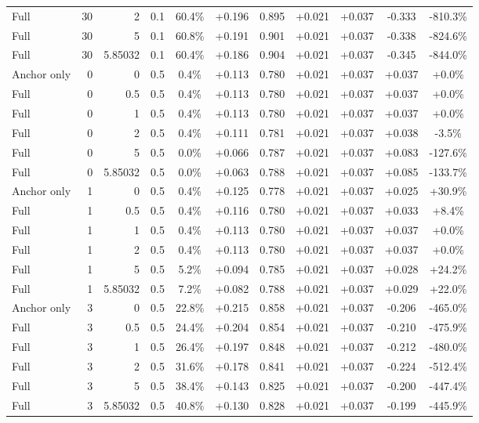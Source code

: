 \begin{table}[htbp]
\begin{tabular}{lrrrccccccc}
Full & 30 & 2 & 0.1 & 60.4\% & +0.196 & 0.895 & +0.021 & +0.037 & -0.333 & -810.3\% \\
Full & 30 & 5 & 0.1 & 60.8\% & +0.191 & 0.901 & +0.021 & +0.037 & -0.338 & -824.6\% \\
Full & 30 & 5.85032 & 0.1 & 60.4\% & +0.186 & 0.904 & +0.021 & +0.037 & -0.345 & -844.0\% \\
Anchor only & 0 & 0 & 0.5 & 0.4\% & +0.113 & 0.780 & +0.021 & +0.037 & +0.037 & +0.0\% \\
Full & 0 & 0.5 & 0.5 & 0.4\% & +0.113 & 0.780 & +0.021 & +0.037 & +0.037 & +0.0\% \\
Full & 0 & 1 & 0.5 & 0.4\% & +0.113 & 0.780 & +0.021 & +0.037 & +0.037 & +0.0\% \\
Full & 0 & 2 & 0.5 & 0.4\% & +0.111 & 0.781 & +0.021 & +0.037 & +0.038 & -3.5\% \\
Full & 0 & 5 & 0.5 & 0.0\% & +0.066 & 0.787 & +0.021 & +0.037 & +0.083 & -127.6\% \\
Full & 0 & 5.85032 & 0.5 & 0.0\% & +0.063 & 0.788 & +0.021 & +0.037 & +0.085 & -133.7\% \\
Anchor only & 1 & 0 & 0.5 & 0.4\% & +0.125 & 0.778 & +0.021 & +0.037 & +0.025 & +30.9\% \\
Full & 1 & 0.5 & 0.5 & 0.4\% & +0.116 & 0.780 & +0.021 & +0.037 & +0.033 & +8.4\% \\
Full & 1 & 1 & 0.5 & 0.4\% & +0.113 & 0.780 & +0.021 & +0.037 & +0.037 & +0.0\% \\
Full & 1 & 2 & 0.5 & 0.4\% & +0.113 & 0.780 & +0.021 & +0.037 & +0.037 & +0.0\% \\
Full & 1 & 5 & 0.5 & 5.2\% & +0.094 & 0.785 & +0.021 & +0.037 & +0.028 & +24.2\% \\
Full & 1 & 5.85032 & 0.5 & 7.2\% & +0.082 & 0.788 & +0.021 & +0.037 & +0.029 & +22.0\% \\
Anchor only & 3 & 0 & 0.5 & 22.8\% & +0.215 & 0.858 & +0.021 & +0.037 & -0.206 & -465.0\% \\
Full & 3 & 0.5 & 0.5 & 24.4\% & +0.204 & 0.854 & +0.021 & +0.037 & -0.210 & -475.9\% \\
Full & 3 & 1 & 0.5 & 26.4\% & +0.197 & 0.848 & +0.021 & +0.037 & -0.212 & -480.0\% \\
Full & 3 & 2 & 0.5 & 31.6\% & +0.178 & 0.841 & +0.021 & +0.037 & -0.224 & -512.4\% \\
Full & 3 & 5 & 0.5 & 38.4\% & +0.143 & 0.825 & +0.021 & +0.037 & -0.200 & -447.4\% \\
Full & 3 & 5.85032 & 0.5 & 40.8\% & +0.130 & 0.828 & +0.021 & +0.037 & -0.199 & -445.9\% \\

\end{tabular}
\end{table}
